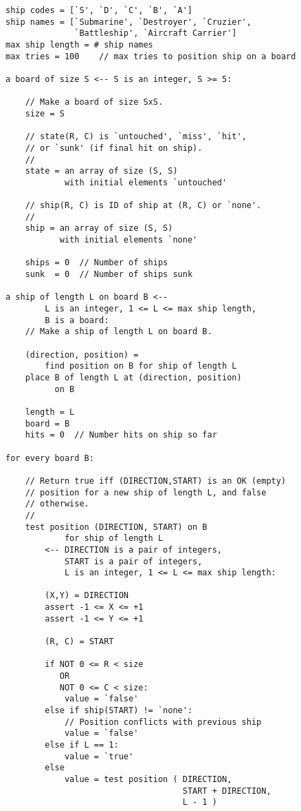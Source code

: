 \documentclass[12pt]{article}
\begin{document}
\begin{verbatim}
ship codes = [`S', `D', `C', `B', `A']
ship names = [`Submarine', `Destroyer', `Cruzier',
              `Battleship', `Aircraft Carrier']
max ship length = # ship names
max tries = 100    // max tries to position ship on a board

a board of size S <-- S is an integer, S >= 5:

    // Make a board of size SxS.
    size = S

    // state(R, C) is `untouched', `miss', `hit',
    // or `sunk' (if final hit on ship).
    //
    state = an array of size (S, S)
            with initial elements `untouched'

    // ship(R, C) is ID of ship at (R, C) or `none'.
    //
    ship = an array of size (S, S)
           with initial elements `none'

    ships = 0  // Number of ships
    sunk  = 0  // Number of ships sunk

a ship of length L on board B <--
        L is an integer, 1 <= L <= max ship length,
        B is a board:
    // Make a ship of length L on board B.

    (direction, position) =
        find position on B for ship of length L
    place B of length L at (direction, position)
          on B

    length = L
    board = B
    hits = 0  // Number hits on ship so far

for every board B:

    // Return true iff (DIRECTION,START) is an OK (empty)
    // position for a new ship of length L, and false
    // otherwise.
    //
    test position (DIRECTION, START) on B
            for ship of length L
        <-- DIRECTION is a pair of integers,
            START is a pair of integers,
            L is an integer, 1 <= L <= max ship length:

        (X,Y) = DIRECTION
        assert -1 <= X <= +1
        assert -1 <= Y <= +1

        (R, C) = START

        if NOT 0 <= R < size
           OR
           NOT 0 <= C < size:
            value = `false'
        else if ship(START) != `none':
            // Position conflicts with previous ship
            value = `false'
        else if L == 1:
            value = `true'
        else
            value = test position ( DIRECTION,
                                    START + DIRECTION,
                                    L - 1 )


\end{verbatim}
\end{document}
